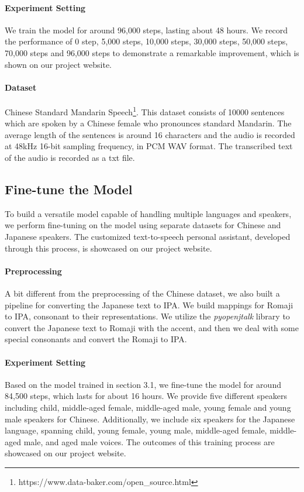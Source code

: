 \documentclass{article}
\begin{document}
\paragraph{Experiment Setting}
We train the model for around 96,000 steps, lasting about 48 hours. We record the performance of 0 step, 5,000 steps, 10,000 steps, 30,000 steps, 50,000 steps, 70,000 steps and 96,000 steps to demonstrate a remarkable improvement, which is shown on our project website.



\paragraph{Dataset} Chinese Standard Mandarin Speech\footnote{https://www.data-baker.com/open\_source.html}. This dataset consists of 10000 sentences which are spoken by a Chinese female who pronounces standard Mandarin. The average length of the sentences is around 16 characters and the audio is recorded at 48kHz 16-bit sampling frequency, in PCM WAV format. The transcribed text of the audio is recorded as a txt file.


\subsection{Fine-tune the Model}
To build a versatile model capable of handling multiple languages and speakers, we perform fine-tuning on the model using separate datasets for Chinese and Japanese speakers. The customized text-to-speech personal assistant, developed through this process, is showcased on our project website.
\paragraph{Preprocessing}
A bit different from the preprocessing of the Chinese dataset, we also built a pipeline for converting the Japanese text to IPA. We build mappings for Romaji to IPA, consonant to their representations. We utilize the \textit{pyopenjtalk} library to convert the Japanese text to Romaji with the accent, and then we deal with some special consonants and convert the Romaji to IPA.
\paragraph{Experiment Setting}
Based on the model trained in section 3.1, we fine-tune the model for around 84,500 steps, which lasts for about 16 hours. We provide five different speakers including child, middle-aged female, middle-aged male, young female and young male speakers for Chinese. Additionally, we include six speakers for the Japanese language, spanning child, young female, young male, middle-aged female, middle-aged male, and aged male voices. The outcomes of this training process are showcased on our project website.
\end{document}
